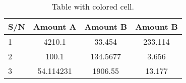 \documentclass{article}
\begin{document}
 \begin{table}[h!]
        \begin{center}
      \caption{Table with  colored cell.}
     \label{tab:table1}
       \begin{tabular}{l|S|S|c}
   \hline
      \textbf{S/N} & \textbf{Amount A} & \textbf{Amount B} & \textbf{Amount B}\\
   \hline
       1 & 4210.1 & 33.454 & 233.114\\
       2 & 100.1 & 134.5677 & 3.656\\
       3 & 54.114231 & 1906.55 & 13.177\\
\end{tabular}
\end{center}
\end{table}
\end{document}
